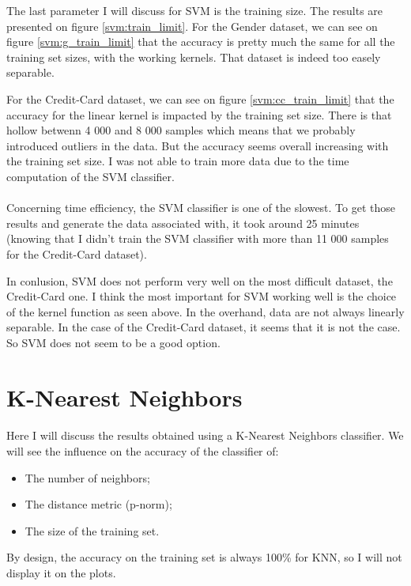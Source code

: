 \documentclass[10pt]{article}
\begin{document}
			The last parameter I will discuss for SVM is the training size. The results are presented on figure \ref{svm:train_limit}.
			For the Gender dataset, we can see on figure \ref{svm:g_train_limit} that the accuracy is pretty much the same for all the training set sizes, with the working kernels. That dataset is indeed too easely separable.

			For the Credit-Card dataset, we can see on figure \ref{svm:cc_train_limit} that the accuracy for the linear kernel is impacted by the training set size. There is that hollow betwenn 4 000 and 8 000 samples which means that we probably introduced outliers in the data. But the accuracy seems overall increasing with the training set size. I was not able to train more data due to the time computation of the SVM classifier.

		\paragraph*{}
			Concerning time efficiency, the SVM classifier is one of the slowest. To get those results and generate the data associated with, it took around 25 minutes (knowing that I didn't train the SVM classifier with more than 11 000 samples for the Credit-Card dataset).

			In conlusion, SVM does not perform very well on the most difficult dataset, the Credit-Card one. I think the most important for SVM working well is the choice of the kernel function as seen above. In the overhand, data are not always linearly separable. In the case of the Credit-Card dataset, it seems that it is not the case. So SVM does not seem to be a good option.
	\section{K-Nearest Neighbors}
		\paragraph*{}
			Here I will discuss the results obtained using a K-Nearest Neighbors classifier. We will see the influence on the accuracy of the classifier of:
			\begin{itemize}
				\item The number of neighbors;
				\item The distance metric (p-norm);
				\item The size of the training set.
			\end{itemize}
			By design, the accuracy on the training set is always 100\% for KNN, so I will not display it on the plots.
\end{document}
